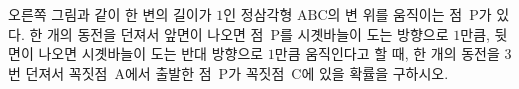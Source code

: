 \noindent\begin{minipage}[t]{0.58\linewidth}\vspace{0pt}\raggedright 오른쪽 그림과 같이 한 변의 길이가 $1$인 정삼각형 $\mathrm{ABC}$의 변 위를 움직이는 점~$\mathrm{P}$가 있다. 한 개의 동전을 던져서 앞면이 나오면 점~$\mathrm{P}$를 시곗바늘이 도는 방향으로 $1$만큼, 뒷면이 나오면 시곗바늘이 도는 반대 방향으로 $1$만큼 움직인다고 할 때, 한 개의 동전을 3번 던져서 꼭짓점~$\mathrm{A}$에서 출발한 점~$\mathrm{P}$가 꼭짓점~$\mathrm{C}$에 있을 확률을 구하시오.\end{minipage}\hfill\begin{minipage}[t]{0.4\linewidth}\vspace{0pt}\centering \resizebox{\ifdim\width>\linewidth\linewidth\else\width\fi}{!}{}\end{minipage}\par
